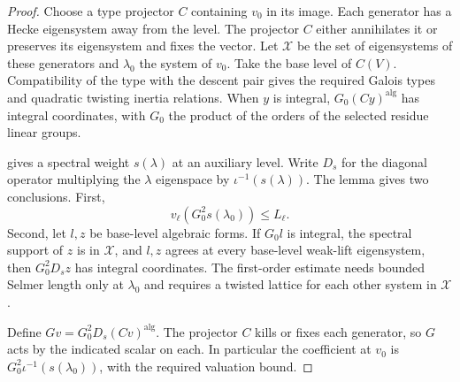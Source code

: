 \begin{proof}
Choose a type projector $C$ containing $v_0$ in its image. Each generator has a Hecke eigensystem away from the level. The projector $C$ either annihilates it or preserves its eigensystem and fixes the vector.
Let $\mathcal X$ be the set of eigensystems of these generators and $\lambda_0$ the system of $v_0$.
Take the base level of $C(V)$. Compatibility of the type with the descent pair gives the required Galois types and quadratic twisting inertia relations. When $y$ is integral, $G_0(Cy)^{\mathrm{alg}}$ has integral coordinates, with $G_0$ the product of the orders of the selected residue linear groups.

 gives a spectral weight $s(\lambda)$ at an auxiliary level. Write $D_s$ for the diagonal operator multiplying the $\lambda$ eigenspace by $\iota^{-1}(s(\lambda))$.
The lemma gives two conclusions. First,
\[
 v_\ell(G_0^2s(\lambda_0))\le L_\ell .
\]
Second, let $l,z$ be base-level algebraic forms. If $G_0l$ is integral, the spectral support of $z$ is in $\mathcal X$, and $l,z$ agrees at every base-level weak-lift eigensystem, then $G_0^2 D_s z$ has integral coordinates. The first-order estimate needs bounded Selmer length only at $\lambda_0$ and requires a twisted lattice for each other system in $\mathcal X$.

Define $Gv=G_0^2D_s(Cv)^{\mathrm{alg}}$. The projector $C$ kills or fixes each generator, so $G$ acts by the indicated scalar on each. In particular the coefficient at $v_0$ is $G_0^2\iota^{-1}(s(\lambda_0))$, with the required valuation bound.


\end{proof}
